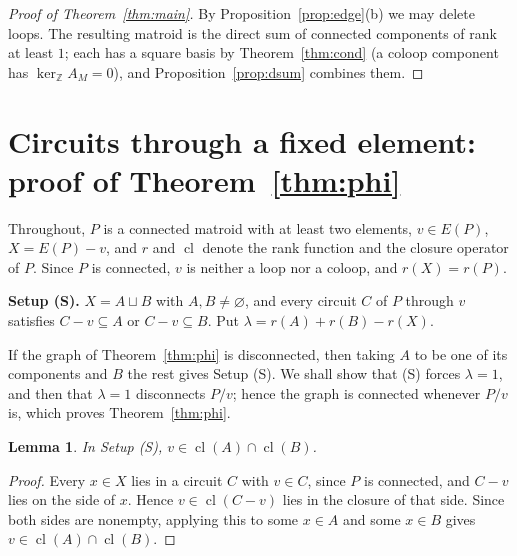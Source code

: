 \documentclass[11pt,a4paper]{article}
\theoremstyle{plain}
\newtheorem{lemma}[theorem]{Lemma}
\theoremstyle{definition}
\newcommand{\Z}{\mathbb Z}
\newcommand{\kerZ}{\ker_{\Z}\!A_M}
\newcommand{\cl}{\operatorname{cl}}
\begin{document}
\begin{proof}[Proof of Theorem~\ref{thm:main}]
By Proposition~\ref{prop:edge}(b) we may delete loops. The resulting matroid is the direct sum of connected components of rank at least $1$; each has a square basis by Theorem~\ref{thm:cond} (a coloop component has $\kerZ=0$), and Proposition~\ref{prop:dsum} combines them.
\end{proof}

\section{Circuits through a fixed element: proof of Theorem~\ref{thm:phi}}\label{sec:phiproof}
Throughout, $P$ is a connected matroid with at least two elements, $v\in E(P)$, $X=E(P)-v$, and $r$ and $\cl$ denote the rank function and the closure operator of $P$. Since $P$ is connected, $v$ is neither a loop nor a coloop, and $r(X)=r(P)$.

\medskip\noindent\textbf{Setup (S).} $X=A\sqcup B$ with $A,B\ne\varnothing$, and every circuit $C$ of $P$ through $v$ satisfies $C-v\subseteq A$ or $C-v\subseteq B$. Put $\lambda=r(A)+r(B)-r(X)$.

If the graph of Theorem~\ref{thm:phi} is disconnected, then taking $A$ to be one of its components and $B$ the rest gives Setup (S). We shall show that (S) forces $\lambda=1$, and then that $\lambda=1$ disconnects $P/v$; hence the graph is connected whenever $P/v$ is, which proves Theorem~\ref{thm:phi}.

\begin{lemma}\label{lem:phi1}
In Setup (S), $v\in\cl(A)\cap\cl(B)$.
\end{lemma}
\begin{proof}
Every $x\in X$ lies in a circuit $C$ with $v\in C$, since $P$ is connected, and $C-v$ lies on the side of $x$. Hence $v\in\cl(C-v)$ lies in the closure of that side. Since both sides are nonempty, applying this to some $x\in A$ and some $x\in B$ gives $v\in\cl(A)\cap\cl(B)$.
\end{proof}
\end{document}
